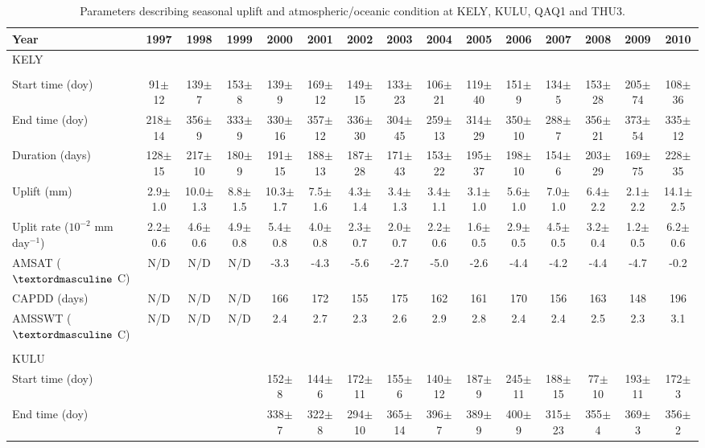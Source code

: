 \clearpage
\begin{table}
\centering
\caption{Parameters describing seasonal uplift and atmospheric/oceanic condition at KELY, KULU, QAQ1 and THU3.}
\begin{adjustbox}{width=1\textwidth}
\begin{threeparttable}
\begin{tabular}{lcccccccccccccc}
\midrule
Year&1997&1998&1999&2000&2001&2002&2003&2004&2005&2006&2007&2008&2009&2010\\
\midrule
KELY& & & & & & & & & & & & & &\\&&&&&&&&&&&&&&\\
Start time (doy)&91$\pm$12&139$\pm$7&153$\pm$8&139$\pm$9&169$\pm$12&149$\pm$15&133$\pm$23&106$\pm$21&119$\pm$40&151$\pm$9&134$\pm$5&153$\pm$28&205$\pm$74&108$\pm$36\\
End time (doy)&218$\pm$14&356$\pm$9&333$\pm$9&330$\pm$16&357$\pm$12&336$\pm$30&304$\pm$45&259$\pm$13&314$\pm$29&350$\pm$10&288$\pm$7&356$\pm$21&373$\pm$54&335$\pm$12\\
Duration (days)&128$\pm$15&217$\pm$10&180$\pm$9&191$\pm$15&188$\pm$13&187$\pm$28&171$\pm$43&153$\pm$22&195$\pm$37&198$\pm$10&154$\pm$6&203$\pm$29&169$\pm$75&228$\pm$35\\
Uplift (mm)&2.9$\pm$1.0&10.0$\pm$1.3&8.8$\pm$1.5&10.3$\pm$1.7&7.5$\pm$1.6&4.3$\pm$1.4&3.4$\pm$1.3&3.4$\pm$1.1&3.1$\pm$1.0&5.6$\pm$1.0&7.0$\pm$1.0&6.4$\pm$2.2&2.1$\pm$2.2&14.1$\pm$2.5\\
Uplit rate ($10^{-2}$ mm day$^{-1}$)&2.2$\pm$0.6&4.6$\pm$0.6&4.9$\pm$0.8&5.4$\pm$0.8&4.0$\pm$0.8&2.3$\pm$0.7&2.0$\pm$0.7&2.2$\pm$0.6&1.6$\pm$0.5&2.9$\pm$0.5&4.5$\pm$0.5&3.2$\pm$0.4&1.2$\pm$0.5&6.2$\pm$0.6\\
AMSAT ($\textordmasculine$ C)&N/D&N/D&N/D&-3.3&-4.3&-5.6&-2.7&-5.0&-2.6&-4.4&-4.2&-4.4&-4.7&-0.2\\
CAPDD (days)&N/D&N/D&N/D&166&172&155&175&162&161&170&156&163&148&196\\
AMSSWT  ($\textordmasculine$ C)&N/D&N/D&N/D&2.4&2.7&2.3&2.6&2.9&2.8&2.4&2.4&2.5&2.3&3.1\\
& & & & & & & & & & & & & &\\
KULU& & & & & & & & & & & & & &\\
Start time (doy)&&&&152$\pm$8&144$\pm$6&172$\pm$11&155$\pm$6&140$\pm$12&187$\pm$9&245$\pm$11&188$\pm$15&77$\pm$10&193$\pm$11&172$\pm$3\\
End time (doy)&&&&338$\pm$7&322$\pm$8&294$\pm$10&365$\pm$14&396$\pm$7&389$\pm$9&400$\pm$9&315$\pm$23&355$\pm$4&369$\pm$3&356$\pm$2\\

\end{tabular}
\end{threeparttable}
\end{adjustbox}
\end{table}
